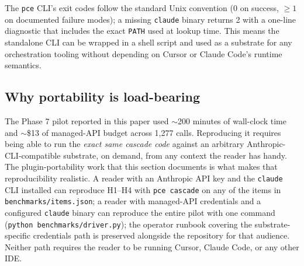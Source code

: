 The \texttt{pce} CLI's exit codes follow the standard Unix convention (0 on success, $\geq 1$ on documented failure modes); a missing \texttt{claude} binary returns 2 with a one-line diagnostic that includes the exact \texttt{PATH} used at lookup time. This means the standalone CLI can be wrapped in a shell script and used as a substrate for any orchestration tooling without depending on Cursor or Claude Code's runtime semantics.

\subsection{Why portability is load-bearing}

The Phase 7 pilot reported in this paper used $\sim$200 minutes of wall-clock time and $\sim$\$13 of managed-API budget across 1,277 calls. Reproducing it requires being able to run the \emph{exact same cascade code} against an arbitrary Anthropic-CLI-compatible substrate, on demand, from any context the reader has handy. The plugin-portability work that this section documents is what makes that reproducibility realistic. A reader with an Anthropic API key and the \texttt{claude} CLI installed can reproduce H1--H4 with \texttt{pce cascade} on any of the items in \nolinkurl{benchmarks/items.json}; a reader with managed-API credentials and a configured \texttt{claude} binary can reproduce the entire pilot with one command (\texttt{python benchmarks/driver.py}); the operator runbook covering the substrate-specific credentials path is preserved alongside the repository for that audience. Neither path requires the reader to be running Cursor, Claude Code, or any other IDE.
